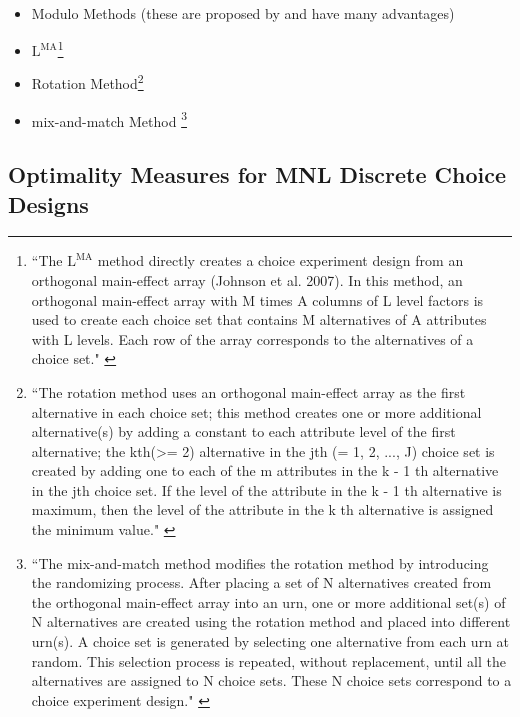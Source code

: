 \documentclass[article, crop=false]{standalone}
\begin{document}
\begin{itemize}
    \item Modulo Methods (these are proposed by \citet{street2007construction} and have many advantages)
    \item $\text{L}^{\text{MA}}$\footnote{``The $\text{L}^{\text{MA}}$ method directly creates a choice experiment design from an orthogonal main-effect array (Johnson et al. 2007). In this method, an orthogonal main-effect array with M times A columns of L level factors is used to create each choice set that contains M alternatives of A attributes with L levels. Each row of the array corresponds to the alternatives of a choice set." \citep{support.CEs}}
    \item Rotation Method\footnote{``The rotation method uses an orthogonal main-effect array as the first alternative in each choice set; this method creates one or more additional alternative(s) by adding a constant to each attribute level of the first alternative; the kth(>= 2) alternative in the jth (= 1, 2, ..., J) choice set is created by adding one to each of the m attributes in the k - 1 th alternative in the jth choice set. If the level of the attribute in the k - 1 th alternative is maximum, then the level of the attribute in the k th alternative is assigned the minimum value." \citep{support.CEs}}
    \item mix-and-match Method \footnote{``The mix-and-match method modifies the rotation method by introducing the randomizing process. After placing a set of N alternatives created from the orthogonal main-effect array into an urn, one or more additional set(s) of N alternatives are created using the rotation method and placed into different urn(s). A choice set is generated by selecting one alternative from each urn at random. This selection process is repeated, without replacement, until all the alternatives are assigned to N choice sets. These N choice sets correspond to a choice experiment design." \citet{support.CEs}}
\end{itemize}


\subsection{Optimality Measures for MNL Discrete Choice Designs}
\end{document}

